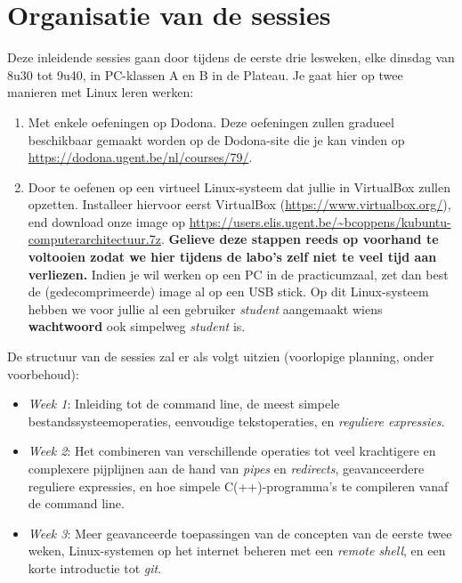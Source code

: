 \documentclass[a4paper,twoside,openany]{memoir}
\begin{document}
\section{Organisatie van de sessies}

Deze inleidende sessies gaan door tijdens de eerste drie lesweken, elke dinsdag
van 8u30 tot 9u40, in PC-klassen A en B in de Plateau. Je gaat hier op twee
manieren met Linux leren werken:

\begin{enumerate}

  \item Met enkele oefeningen op Dodona. Deze oefeningen zullen gradueel
    beschikbaar gemaakt worden op de Dodona-site die je kan vinden op
    \url{https://dodona.ugent.be/nl/courses/79/}.

  \item Door te oefenen op een virtueel Linux-systeem dat jullie in VirtualBox
    zullen opzetten. Installeer hiervoor eerst VirtualBox
    (\url{https://www.virtualbox.org/}), end download onze image op
    \url{https://users.elis.ugent.be/~bcoppens/kubuntu-computerarchitectuur.7z}.
    \textbf{Gelieve deze stappen reeds op voorhand te voltooien zodat we hier
    tijdens de labo's zelf niet te veel tijd aan verliezen.} Indien je wil
    werken op een PC in de practicumzaal, zet dan best de (gedecomprimeerde)
    image al op een USB stick. Op dit Linux-systeem hebben we voor jullie al
    een gebruiker \emph{student} aangemaakt wiens \textbf{wachtwoord} ook
    simpelweg \emph{student} is.

\end{enumerate}

De structuur van de sessies zal er als volgt uitzien (voorlopige planning, onder voorbehoud):

\begin{itemize}

  \item \emph{Week 1}: Inleiding tot de command line, de meest simpele
    bestandssysteemoperaties, eenvoudige tekstoperaties, en \emph{reguliere
    expressies}.

  \item \emph{Week 2}: Het combineren van verschillende operaties tot veel
    krachtigere en complexere pijplijnen aan de hand van \emph{pipes} en
    \emph{redirects}, geavanceerdere reguliere expressies, en hoe simpele
    C(++)-programma's te compileren vanaf de command line.

  \item \emph{Week 3}: Meer geavanceerde toepassingen van de concepten van de
    eerste twee weken, Linux-systemen op het internet beheren met een
    \emph{remote shell}, en een korte introductie tot \emph{git}.

\end{itemize}
\end{document}
